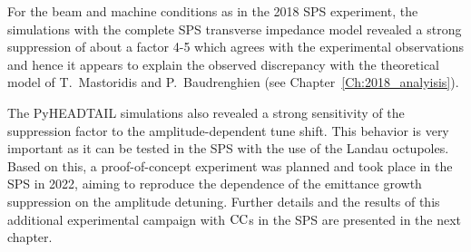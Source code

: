 For the beam and machine conditions as in the 2018 SPS experiment, the simulations with the complete SPS transverse impedance model revealed a strong suppression of about a factor 4-5 which agrees with the experimental observations and hence it appears to explain the observed discrepancy with the theoretical model of T.~Mastoridis and P.~Baudrenghien (see Chapter~\ref{Ch:2018_analyisis}). 

The PyHEADTAIL simulations also revealed a strong sensitivity of the suppression factor to the amplitude-dependent tune shift. This behavior is very important as it can be tested in the SPS with the use of the Landau octupoles. Based on this, a proof-of-concept experiment was planned and took place in the SPS in 2022, aiming to reproduce the dependence of the emittance growth suppression on the amplitude detuning. Further details and the results of this additional experimental campaign with ${\mathrm{CC}}$s in the SPS are presented in the next chapter.




